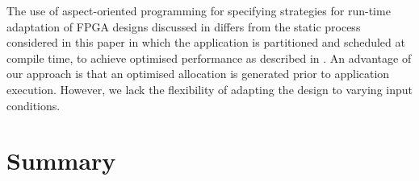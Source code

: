The use of aspect-oriented programming for specifying strategies for
run-time adaptation of FPGA designs discussed in \cite{6322875}
differs from the static process considered in this paper in which the
application is partitioned and scheduled at compile time, to achieve
optimised performance as described in
\cite{Xinyu:Qiwei:Luk:Qiang:Pell:2012}. An advantage of our approach
is that an optimised allocation is generated prior to application
execution. However, we lack the flexibility of adapting the design to
varying input conditions.

\section{Summary}
